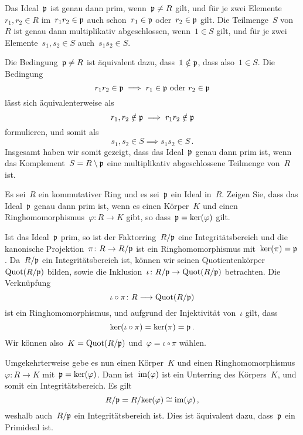 \documentclass{scrartcl}
\begin{document}
\begin{solution}
  Das Ideal~$\mathfrak{p}$ ist genau dann prim, wenn~$\mathfrak{p} \neq R$ gilt, und für je zwei Elemente~$r_1, r_2 \in R$ im~$r_1 r_2 \in \mathfrak{p}$ auch schon~$r_1 \in \mathfrak{p}$ oder~$r_2 \in \mathfrak{p}$ gilt.
  Die Teilmenge~$S$ von~$R$ ist genau dann multiplikativ abgeschlossen, wenn~$1 \in S$ gilt, und für je zwei Elemente~$s_1, s_2 \in S$ auch~$s_1 s_2 \in S$.

  Die Bedingung~$\mathfrak{p} \neq R$ ist äquivalent dazu, dass~$1 \notin \mathfrak{p}$, dass also~$1 \in S$.
  Die Bedingung
  \[
    r_1 r_2 \in \mathfrak{p}
    \implies
    \text{$r_1 \in \mathfrak{p}$ oder~$r_2 \in \mathfrak{p}$}
  \]
  lässt sich äquivalenterweise als
  \[
    r_1, r_2 \notin \mathfrak{p} \implies r_1 r_2 \notin \mathfrak{p}
  \]
  formulieren, und somit als
  \[
    s_1, s_2 \in S \implies s_1 s_2 \in S \,.
  \]
  Insgesamt haben wir somit gezeigt, dass das Ideal~$\mathfrak{p}$ genau dann prim ist, wenn das Komplement~$S = R \setminus \mathfrak{p}$ eine multiplikativ abgeschlossene Teilmenge von~$R$ ist.
\end{solution}

\begin{exercise}
  Es sei~$R$ ein kommutativer Ring und es sei~$\mathfrak{p}$ ein Ideal in~$R$.
  Zeigen Sie, dass das Ideal~$\mathfrak{p}$ genau dann prim ist, wenn es einen Körper~$K$ und einen Ringhomomorphismus~$\varphi \colon R \to K$ gibt, so dass~$\mathfrak{p} = \ker(\varphi)$ gilt.
\end{exercise}

\begin{solution}
  Ist das Ideal~$\mathfrak{p}$ prim, so ist der Faktorring~$R/\mathfrak{p}$ eine Integritätsbereich und die kanonische Projektion~$\pi \colon R \to R/\pideal$ ist ein Ringhomomorphismus mit~$\ker(\pi) = \mathfrak{p}$.
  Da~$R/\mathfrak{p}$ ein Integritätsbereich ist, können wir seinen Quotientenkörper~$\operatorname{Quot}(R/\mathfrak{p})$ bilden, sowie die Inklusion~$\iota \colon R/\pideal \to \Quot(R/\pideal)$ betrachten.
  Die Verknüpfung
  \[
    \iota \circ \pi
    \colon
    R
    \to
    \Quot(R/\pideal)
  \]
  ist ein Ringhomomorphismus, und aufgrund der Injektivität von~$\iota$ gilt, dass
  \[
    \ker(\iota \circ \pi)
    =
    \ker(\pi)
    =
    \mathfrak{p} \,.
  \]
  Wir können also~$K = \operatorname{Quot}(R/\mathfrak{p})$ und~$\varphi = \iota \circ \pi$ wählen.

  Umgekehrterweise gebe es nun einen Körper~$K$ und einen Ringhomomorphismus~$\varphi \colon R \to K$ mit~$\mathfrak{p} = \ker(\varphi)$.
  Dann ist~$\operatorname{im}(\varphi)$ ist ein Unterring des Körpers~$K$, und somit ein Integritätsbereich.
  Es gilt
  \[
    R / \mathfrak{p}
    =
    R / {\ker(\varphi)}
    \cong
    \operatorname{im}(\varphi) \,,
  \]
  weshalb auch~$R/\mathfrak{p}$ ein Integritätsbereich ist.
  Dies ist äquivalent dazu, dass~$\mathfrak{p}$ ein Primideal ist.
\end{solution}




\clearpage




\printsolutions
\end{document}
